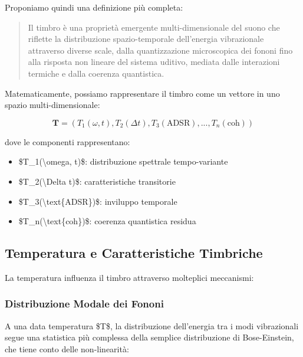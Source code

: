\documentclass[a4paper,11pt]{article}
\begin{document}
Proponiamo quindi una definizione più completa:

\begin{quote}
Il timbro è una proprietà emergente multi-dimensionale del suono che
riflette la distribuzione spazio-temporale dell'energia vibrazionale
attraverso diverse scale, dalla quantizzazione microscopica dei fononi
fino alla risposta non lineare del sistema uditivo, mediata dalle
interazioni termiche e dalla coerenza quantistica.
\end{quote}

Matematicamente, possiamo rappresentare il timbro come un vettore in uno
spazio multi-dimensionale:

\begin{displaymath}
\mathbf{T} = \left(T_1(\omega, t), T_2(\Delta t), T_3(\text{ADSR}), ..., T_n(\text{coh})\right)
\end{displaymath}

dove le componenti rappresentano:

\begin{itemize}
\item{} \$T\_1(\textbackslash{}omega, t)\$: distribuzione spettrale tempo-variante
\item{} \$T\_2(\textbackslash{}Delta t)\$: caratteristiche transitorie
\item{} \$T\_3(\textbackslash{}text\{ADSR\})\$: inviluppo temporale
\item{} \$T\_n(\textbackslash{}text\{coh\})\$: coerenza quantistica residua
\end{itemize}

\subsection{Temperatura e Caratteristiche Timbriche}\hypertarget{temperatura-e-caratteristiche-timbriche}{}\label{temperatura-e-caratteristiche-timbriche}

La temperatura influenza il timbro attraverso molteplici meccanismi:

\subsubsection{Distribuzione Modale dei Fononi}\hypertarget{distribuzione-modale-dei-fononi}{}\label{distribuzione-modale-dei-fononi}

A una data temperatura \$T\$, la distribuzione dell'energia tra i modi
vibrazionali segue una statistica più complessa della semplice
distribuzione di Bose-Einstein, che tiene conto delle non-linearità:
\end{document}
